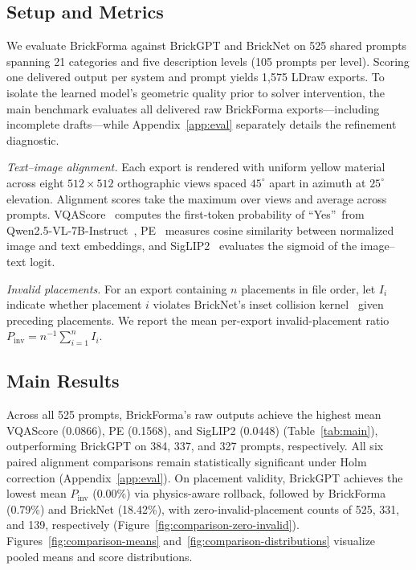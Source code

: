 \documentclass[letterpaper]{article} %
\begin{document}
\subsection{Setup and Metrics}
\label{sec:setup}
We evaluate BrickForma against BrickGPT and BrickNet on 525 shared prompts spanning 21 categories and five description levels (105 prompts per level). Scoring one delivered output per system and prompt yields 1,575 LDraw exports. To isolate the learned model's geometric quality prior to solver intervention, the main benchmark evaluates all delivered raw BrickForma exports---including incomplete drafts---while Appendix~\ref{app:eval} separately details the refinement diagnostic.

\emph{Text--image alignment.}
Each export is rendered with uniform yellow material across eight $512{\times}512$ orthographic views spaced $45^\circ$ apart in azimuth at $25^\circ$ elevation. Alignment scores take the maximum over views and average across prompts. VQAScore~\cite{vqascore} computes the first-token probability of \textquotedblleft Yes\textquotedblright\ from Qwen2.5-VL-7B-Instruct~\cite{qwen25vl}, PE~\cite{pe} measures cosine similarity between normalized image and text embeddings, and SigLIP2~\cite{siglip2} evaluates the sigmoid of the image--text logit.

\emph{Invalid placements.}
For an export containing $n$ placements in file order, let $I_i$ indicate whether placement $i$ violates BrickNet's inset collision kernel~\cite{bricknet} given preceding placements. We report the mean per-export invalid-placement ratio $P_{\mathrm{inv}}=n^{-1}\sum_{i=1}^{n}I_i$.

\subsection{Main Results}

Across all 525 prompts, BrickForma's raw outputs achieve the highest mean VQAScore (0.0866), PE (0.1568), and SigLIP2 (0.0448) (Table~\ref{tab:main}), outperforming BrickGPT on 384, 337, and 327 prompts, respectively. All six paired alignment comparisons remain statistically significant under Holm correction (Appendix~\ref{app:eval}). On placement validity, BrickGPT achieves the lowest mean $P_{\mathrm{inv}}$ (0.00\%) via physics-aware rollback, followed by BrickForma (0.79\%) and BrickNet (18.42\%), with zero-invalid-placement counts of 525, 331, and 139, respectively (Figure~\ref{fig:comparison-zero-invalid}). Figures~\ref{fig:comparison-means} and~\ref{fig:comparison-distributions} visualize pooled means and score distributions.
\end{document}
